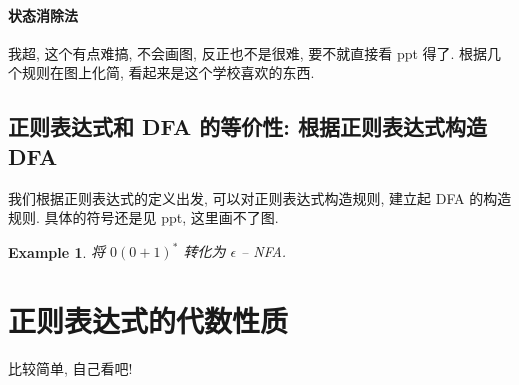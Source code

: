 \documentclass[12pt]{ctexart}
\theoremstyle{definition}
\theoremstyle{definition}
\theoremstyle{plain}
\newtheorem{exam}[definition]{Example}
\begin{document}
\paragraph{状态消除法} 
我超, 这个有点难搞, 不会画图, 反正也不是很难, 要不就直接看 ppt 得了. 根据几个规则在图上化简, 看起来是这个学校喜欢的东西. 

\subsection{正则表达式和 DFA 的等价性: 根据正则表达式构造 DFA}
我们根据正则表达式的定义出发, 可以对正则表达式构造规则, 建立起 DFA 的构造规则. 具体的符号还是见 ppt, 这里画不了图. 
\begin{exam}
将 \( 0 (0+1)^{*}\) 转化为 \(\epsilon\) -- NFA.
\end{exam}

\section{正则表达式的代数性质}\label{sec:3}
比较简单, 自己看吧!
\end{document}
